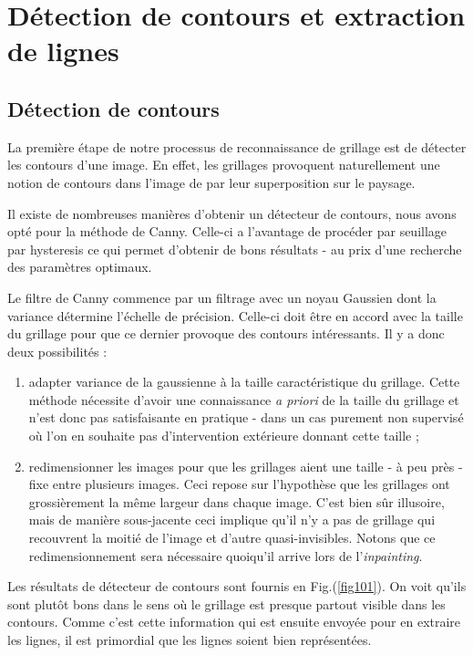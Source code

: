 \section{Détection de contours et extraction de lignes}

\subsection{Détection de contours}

La première étape de notre processus de reconnaissance de grillage est de détecter les contours d'une image. En effet, les grillages provoquent naturellement une notion de contours dans l'image de par leur superposition sur le paysage.

Il existe de nombreuses manières d'obtenir un détecteur de contours, nous avons opté pour la méthode de Canny. Celle-ci a l'avantage de procéder par seuillage par hysteresis ce qui permet d'obtenir de bons résultats - au prix d'une recherche des paramètres optimaux.

Le filtre de Canny commence par un filtrage avec un noyau Gaussien dont la variance détermine l'échelle de précision. Celle-ci doit être en accord avec la taille du grillage pour que ce dernier provoque des contours intéressants. Il y a donc deux possibilités :
\begin{enumerate}
\item adapter variance de la gaussienne à la taille caractéristique du grillage. Cette méthode nécessite d'avoir une connaissance \emph{a priori} de la taille du grillage et n'est donc pas satisfaisante en pratique - dans un cas purement non supervisé où l'on en souhaite pas d'intervention extérieure donnant cette taille ;
\item redimensionner les images pour que les grillages aient une taille - à peu près - fixe entre plusieurs images. Ceci repose sur l'hypothèse que les grillages ont grossièrement la même largeur dans chaque image. C'est bien sûr illusoire, mais de manière sous-jacente ceci implique qu'il n'y a pas de grillage qui recouvrent la moitié de l'image et d'autre quasi-invisibles. Notons que ce redimensionnement sera nécessaire quoiqu'il arrive lors de l'\emph{inpainting}.
\end{enumerate}

Les résultats de détecteur de contours sont fournis en Fig.(\ref{fig101}). On voit qu'ils sont plutôt bons dans le sens où le grillage est presque partout visible dans les contours. Comme c'est cette information qui est ensuite envoyée pour en extraire les lignes, il est primordial que les lignes soient bien représentées.

